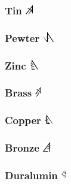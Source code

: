 \documentclass[conference]{IEEEtran}
\begin{document}
	\subsubsection{\textbf{Tin}        \includegraphics[height=1em]{images/Tin_(Feruchemy).png}}\label{sec:ferrings:tin}
	\subsubsection{\textbf{Pewter}    \includegraphics[height=1em]{images/Pewter_(Feruchemy).png}}\label{sec:ferrings:pewter}
	\subsubsection{\textbf{Zinc}    \includegraphics[height=1em]{images/Zinc_(Feruchemy).png}}\label{sec:ferrings:zinc}
	\subsubsection{\textbf{Brass}    \includegraphics[height=1em]{images/Brass_(Feruchemy).png}}\label{sec:ferrings:brass}
	\subsubsection{\textbf{Copper}    \includegraphics[height=1em]{images/Copper_(Feruchemy).png}}\label{sec:ferrings:copper}
	\subsubsection{\textbf{Bronze}    \includegraphics[height=1em]{images/Bronze_(Feruchemy).png}}\label{sec:ferrings:bronze}
	\subsubsection{\textbf{Duralumin}    \includegraphics[height=1em]{images/Duralumin_(Feruchemy).png}}\label{sec:ferrings:duralumin}
\end{document}
